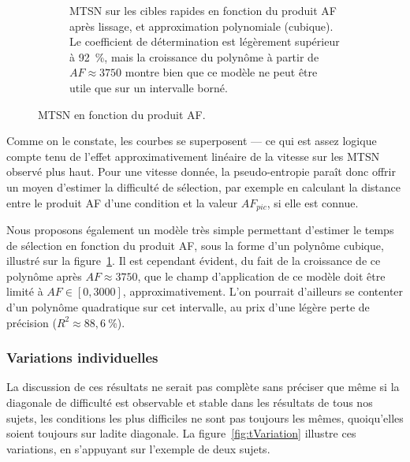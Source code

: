 \begin{figure}[!htb]
\begin{subfigure}[t]{\textwidth}
			\caption{MTSN sur les cibles rapides en fonction du produit AF après lissage, et approximation polynomiale (cubique). Le coefficient de détermination est légèrement supérieur à 92~\%{}, mais la croissance du polynôme à partir de $AF \approx 3750$ montre bien que ce modèle ne peut être utile que sur un intervalle borné.}
			\label{fig:tAF_smooth}
		\end{subfigure}
		\caption[MTSN en fonction du produit AF]{MTSN en fonction du produit AF.}
		\label{fig:tAF}
	\end{figure}
	
	Comme on le constate, les courbes se superposent --- ce qui est assez logique compte tenu de l'effet approximativement linéaire de la vitesse sur les MTSN observé plus haut. Pour une vitesse donnée, la pseudo-entropie paraît donc offrir un moyen d'estimer la difficulté de sélection, par exemple en calculant la distance entre le produit AF d'une condition et la valeur $AF_{pic}$, si elle est connue.
	
	Nous proposons également un modèle très simple permettant d'estimer le temps de sélection en fonction du produit AF, sous la forme d'un polynôme cubique, illustré sur la figure~\ref{fig:tAF_smooth}. Il est cependant évident, du fait de la croissance de ce polynôme après $AF \approx 3750$, que le champ d'application de ce modèle doit être limité à $AF \in [0, 3000]$, approximativement. L'on pourrait d'ailleurs se contenter d'un polynôme quadratique sur cet intervalle, au prix d'une légère perte de précision ($R^{2} \approx 88,6~\%{}$).
	
	\subsubsection{Variations individuelles}
	La discussion de ces résultats ne serait pas complète sans préciser que même si la \og diagonale de difficulté \fg{} est observable et stable dans les résultats de tous nos sujets, les conditions les plus difficiles ne sont pas toujours les mêmes, quoiqu'elles soient toujours sur ladite diagonale. La figure~\ref{fig:tVariation} illustre ces variations, en s'appuyant sur l'exemple de deux sujets.
	
